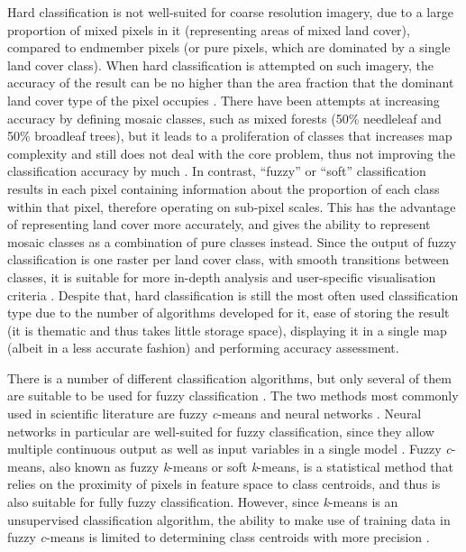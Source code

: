 \documentclass[a4paper,10pt]{article}
\begin{document}
Hard classification is not well-suited for coarse resolution imagery, due to a large proportion of mixed pixels in it (representing areas of mixed land cover), compared to endmember pixels (or pure pixels, which are dominated by a single land cover class). When hard classification is attempted on such imagery, the accuracy of the result can be no higher than the area fraction that the dominant land cover type of the pixel occupies \citep{latifovic2004accuracy}. There have been attempts at increasing accuracy by defining mosaic classes, such as mixed forests (50\% needleleaf and 50\% broadleaf trees), but it leads to a proliferation of classes that increases map complexity and still does not deal with the core problem, thus not improving the classification accuracy by much \citep{tsendbazar2016comparative}. In contrast, ``fuzzy'' or ``soft'' classification results in each pixel containing information about the proportion of each class within that pixel, therefore operating on sub-pixel scales. This has the advantage of representing land cover more accurately, and gives the ability to represent mosaic classes as a combination of pure classes instead. Since the output of fuzzy classification is one raster per land cover class, with smooth transitions between classes, it is suitable for more in-depth analysis and user-specific visualisation criteria \citep{tsendbazar2016integrating}. Despite that, hard classification is still the most often used classification type due to the number of algorithms developed for it, ease of storing the result (it is thematic and thus takes little storage space), displaying it in a single map (albeit in a less accurate fashion) and performing accuracy assessment.

There is a number of different classification algorithms, but only several of them are suitable to be used for fuzzy classification \citep{nath2014methods}. The two methods most commonly used in scientific literature are fuzzy \textit{c}-means and neural networks \citep{zhang2001fullyfuzzy}. Neural networks in particular are well-suited for fuzzy classification, since they allow multiple continuous output as well as input variables in a single model \citep{foody1997fuzzynnet}. Fuzzy \textit{c}-means, also known as fuzzy \textit{k}-means or soft \textit{k}-means, is a statistical method that relies on the proximity of pixels in feature space to class centroids, and thus is also suitable for fully fuzzy classification. However, since \textit{k}-means is an unsupervised classification algorithm, the ability to make use of training data in fuzzy \textit{c}-means is limited to determining class centroids with more precision \citep{hengl2004fuzzycmeans}.
\end{document}
